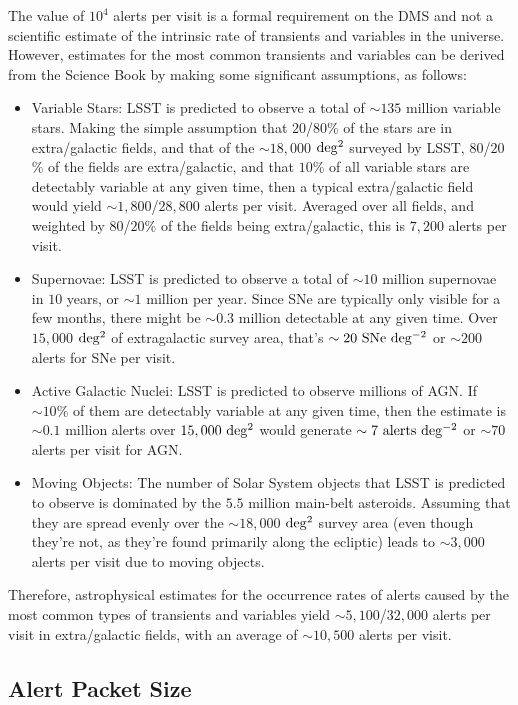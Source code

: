 \documentclass[DM,authoryear,toc]{lsstdoc}
\begin{document}
The value of $10^4$ alerts per visit is a formal requirement on the DMS and not a scientific estimate of the intrinsic rate of transients and variables in the universe. However, estimates for the most common transients and variables can be derived from the Science Book \citep{2009arXiv0912.0201L} by making some significant assumptions, as follows:
\begin{itemize}
\item Variable Stars: LSST is predicted to observe a total of $\sim135$ million variable stars. Making the simple assumption that $20$/$80$\% of the stars are in extra/galactic fields, and that of the $\sim18,000$ $\rm deg^2$ surveyed by LSST, $80$/$20$\% of the fields are extra/galactic, and that $10$\% of all variable stars are detectably variable at any given time, then a typical extra/galactic field would yield $\sim1,800$/$28,800$ alerts per visit. Averaged over all fields, and weighted by $80$/$20$\% of the fields being extra/galactic, this is $7,200$ alerts per visit.
\item Supernovae: LSST is predicted to observe a total of $\sim10$ million supernovae in $10$ years, or $\sim1$ million per year. Since SNe are typically only visible for a few months, there might be $\sim0.3$ million detectable at any given time. Over $15,000$ $\rm deg^{2}$ of extragalactic survey area, that's $\sim20\ {\rm SNe\ deg^{-2}}$ or $\sim200$ alerts for SNe per visit.
\item Active Galactic Nuclei: LSST is predicted to observe millions of AGN. If $\sim10\%$ of them are detectably variable at any given time, then the estimate is $\sim0.1$ million alerts over $15,000\ {\rm deg^2}$ would generate $\sim7\ {\rm alerts\ deg^{-2}}$ or $\sim70$ alerts per visit for AGN.
\item Moving Objects: The number of Solar System objects that LSST is predicted to observe is dominated by the $5.5$ million main-belt asteroids. Assuming that they are spread evenly over the $\sim18,000$ $\rm deg^2$ survey area (even though they're not, as they're found primarily along the ecliptic) leads to $\sim3,000$ alerts per visit due to moving objects.
\end{itemize} 
Therefore, astrophysical estimates for the occurrence rates of alerts caused by the most common types of transients and variables yield $\sim5,100$/$32,000$ alerts per visit in extra/galactic fields, with an average of $\sim10,500$ alerts per visit.


\subsection{Alert Packet Size}\label{ssec:packet_size}
\end{document}
